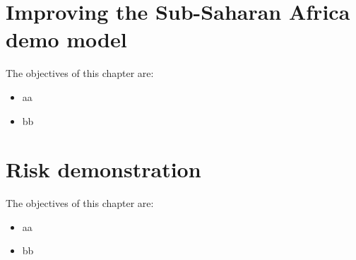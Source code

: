 \documentclass[11pt,a4paper,headings=small,dvips]{scrbook}
\newenvironment{myfancybox}{%
  \def\FrameCommand{\fboxsep=\FrameSep \fcolorbox{blue01}{honeydew}}%
  \color{black}\MakeFramed {\FrameRestore}}%
 {\endMakeFramed}
\begin{document}
\chapter{Improving the Sub-Saharan Africa demo model}
\begin{myfancybox}
The objectives of this chapter are:
\begin{itemize}
    \item aa
    \item bb
\end{itemize}
\end{myfancybox}
    
\cleardoublepage
\chapter{Risk demonstration}
\begin{myfancybox}
The objectives of this chapter are:
\begin{itemize}
    \item aa
    \item bb
\end{itemize}
\end{myfancybox}
    
\cleardoublepage
\cleardoublepage


\cleardoublepage
\end{document}

